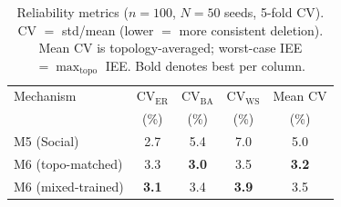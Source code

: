 \begin{table}[htbp]
\caption{Reliability metrics ($n=100$, $N=50$ seeds, 5-fold CV). CV $=$ std/mean (lower $=$ more consistent deletion). Mean CV is topology-averaged; worst-case IEE $= \max_{\mathrm{topo}}$ IEE. Bold denotes best per column.}
\label{tab:reliability}
\centering
\scriptsize
\renewcommand{\arraystretch}{1.1}
\begin{tabular}{lcccc}
\toprule
Mechanism & CV$_\mathrm{ER}$ & CV$_\mathrm{BA}$ & CV$_\mathrm{WS}$ & Mean CV \\
 & (\%) & (\%) & (\%) & (\%) \\
\midrule
M5 (Social) & 2.7 & 5.4 & 7.0 & 5.0 \\
M6 (topo-matched) & 3.3 & \textbf{3.0} & 3.5 & \textbf{3.2} \\
M6 (mixed-trained) & \textbf{3.1} & 3.4 & \textbf{3.9} & 3.5 \\
\bottomrule
\end{tabular}
\end{table}
